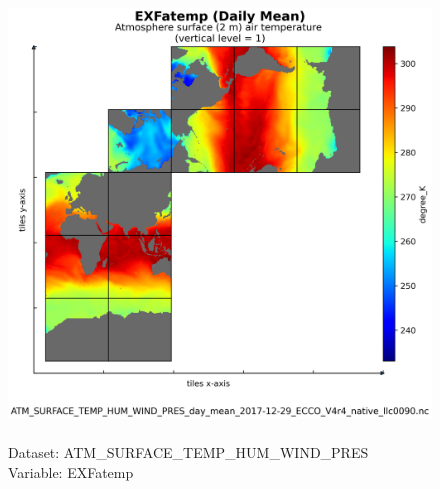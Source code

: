 \begin{figure}[H]
\centering
\includegraphics[scale=0.5]{../images/plots/native_plots/Atmosphere_Surface_Temperature_Humidity_Wind_and_Pressure/EXFatemp.png}
\caption{\\Dataset: ATM\_SURFACE\_TEMP\_HUM\_WIND\_PRES\\Variable: EXFatemp}
\label{tab:table-ATM_SURFACE_TEMP_HUM_WIND_PRES_EXFatemp-Plot}
\end{figure}
\pagebreak

